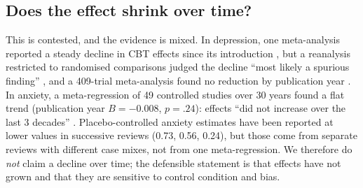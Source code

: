 \subsection{Does the effect shrink over time?}
This is contested, and the evidence is mixed.
In depression, one meta-analysis reported a steady decline in CBT effects since its introduction \citep{johnsen2015decline}, but a reanalysis restricted to randomised comparisons judged the decline ``most likely a spurious finding'' \citep{cristea2017notfalling}, and a 409-trial meta-analysis found no reduction by publication year \citep{cuijpers2023cbtdepression}.
In anxiety, a meta-regression of 49 controlled studies over 30 years found a flat trend (publication year $B=-0.008$, $p=.24$): effects ``did not increase over the last 3 decades'' \citep{hofmann2025effectsizes}.
Placebo-controlled anxiety estimates have been reported at lower values in successive reviews (0.73, 0.56, 0.24), but those come from separate reviews with different case mixes, not from one meta-regression.
We therefore do \emph{not} claim a decline over time; the defensible statement is that effects have not grown and that they are sensitive to control condition and bias.
